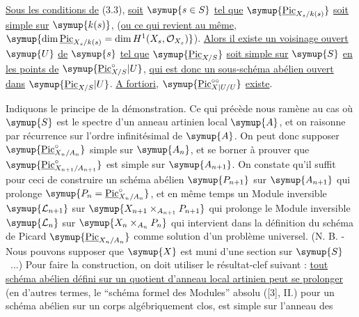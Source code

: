  \uline{Sous les conditions de} (3.3), \uline{soit} $\symup{s\in S}$ \uline{tel que}
$\symup{\underline{\operatorname{Pic}}_{X_s/k(s)}}$ \uline{soit simple sur} $\symup{k(s)}$, (\uline{ou ce qui revient au
même}, $\symup{\dim\underline{\operatorname{Pic}}_{X_s/k(s)}=\dim H^1(X_s,\mathcal O_{X_s})}$).
\uline{Alors il existe un voisinage ouvert} $\symup{U}$ \uline{de} $\symup{s}$ \uline{tel que}
$\symup{\underline{\operatorname{Pic}}_{X/S}}$ \uline{soit simple sur} $\symup{S}$ \uline{en les points de}
$\symup{\underline{\operatorname{Pic}}_{X/S}^\circ|U}$, \uline{qui est donc un sous-schéma abélien ouvert
dans} $\symup{\underline{\operatorname{Pic}}_{X/S}|U}$. \uline{A fortiori},
$\symup{\underline{\operatorname{Pic}}_{X|U/U}^{\circ\circ}}$ \uline{existe}.

Indiquons le principe de la démonstration. Ce qui précède nous ramène au cas où
$\symup{S}$ est le spectre d'un anneau artinien local $\symup{A}$, et on raisonne par récurrence
sur l'ordre infinitésimal de $\symup{A}$. On peut donc supposer
$\symup{\underline{\operatorname{Pic}}_{X_n/A_n}^\circ}$ simple sur $\symup{A_n}$, et se borner à prouver
que $\symup{\underline{\operatorname{Pic}}_{X_{n+1}/A_{n+1}}^\circ}$ est simple sur $\symup{A_{n+1}}$. On
constate qu'il suffit pour ceci de construire un schéma abélien $\symup{P_{n+1}}$ sur
$\symup{A_{n+1}}$ qui prolonge $\symup{P_n=\underline{\operatorname{Pic}}_{X_n/A_n}^\circ}$, et en même temps un Module inversible $\symup{\mathcal L_{n+1}}$ sur
$\symup{X_{n+1}\times_{A_{n+1}}P_{n+1}}$ qui prolonge le Module inversible
$\symup{\mathcal L_n}$ sur $\symup{X_n\times_{A_n}P_n}$ qui intervient dans la définition du
schéma de Picard $\symup{\underline{\operatorname{Pic}}_{X_n/A_n}}$ comme solution d'un problème
universel. (N. B. - Nous pouvons supposer que $\symup{X}$ est muni d'une section sur
$\symup{S}$~...) Pour faire la construction, on doit utiliser le résultat-clef suivant :
\uline{tout schéma abélien défini sur un quotient d'anneau local artinien peut se
prolonger} (en d'autres termes, le ``schéma formel des Modules'' absolu ([3],
II.) pour un schéma abélien sur un corps algébriquement clos, est simple sur
l'anneau des

